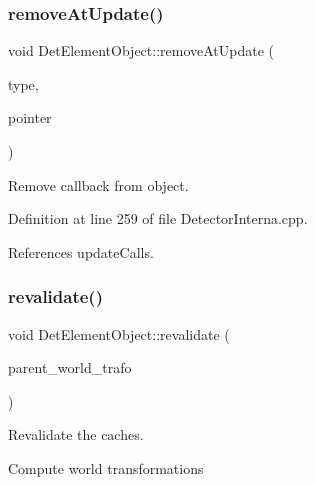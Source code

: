 \hypertarget{class_d_d4hep_1_1_geometry_1_1_det_element_object_ad0d107dfcc7629eb1009cde63e24981b}{}\label{class_d_d4hep_1_1_geometry_1_1_det_element_object_ad0d107dfcc7629eb1009cde63e24981b} 
\subsubsection{\texorpdfstring{remove\+At\+Update()}{removeAtUpdate()}}
{\footnotesize\ttfamily void Det\+Element\+Object\+::remove\+At\+Update (\begin{DoxyParamCaption}\item[{unsigned int}]{type,  }\item[{void $\ast$}]{pointer }\end{DoxyParamCaption})}



Remove callback from object. 



Definition at line 259 of file Detector\+Interna.\+cpp.



References update\+Calls.

\hypertarget{class_d_d4hep_1_1_geometry_1_1_det_element_object_a30a0085da8a1ef8d1253b37e494df066}{}\label{class_d_d4hep_1_1_geometry_1_1_det_element_object_a30a0085da8a1ef8d1253b37e494df066} 
\subsubsection{\texorpdfstring{revalidate()}{revalidate()}}
{\footnotesize\ttfamily void Det\+Element\+Object\+::revalidate (\begin{DoxyParamCaption}\item[{T\+Geo\+H\+Matrix $\ast$}]{parent\+\_\+world\+\_\+trafo }\end{DoxyParamCaption})}



Revalidate the caches. 

Compute world transformations

